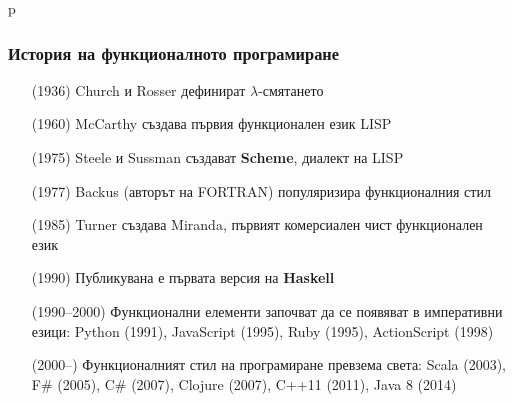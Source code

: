 p\documentclass{beamer}
\begin{document}
\begin{frame}
  \frametitle{История на функционалното програмиране}

  \setlength{\leftmargini}{11ex}
  \begin{itemize}[<+->]
  \item[(1936)] Church и Rosser дефинират $\lambda$-смятането
  \item[(1960)] McCarthy създава първия функционален език LISP
  \item[(1975)] Steele и Sussman създават \textbf{Scheme}, диалект на LISP
  \item[(1977)] Backus (авторът на FORTRAN) популяризира функционалния стил
  \item[(1985)] Turner създава Miranda, първият комерсиален чист функционален език
  \item[(1990)] Публикувана е първата версия на \textbf{Haskell}
  \item[(1990--2000)] Функционални елементи започват да се появяват в императивни езици: Python (1991), JavaScript (1995), Ruby (1995), ActionScript (1998)
  \item[(2000--)] Функционалният стил на програмиране превзема света: Scala (2003), F\# (2005), C\# (2007), Clojure (2007), C++11 (2011), Java 8 (2014)
  \end{itemize}
\end{frame}
\end{document}

